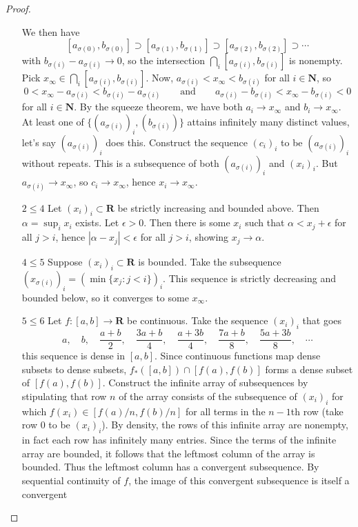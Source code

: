 \documentclass[oneside, 12pt]{memoir}
\theoremstyle{elegant}
\theoremstyle{elegant}
\def\RR{\mathbf R}
\def\NN{\mathbf N}
\begin{document}
\begin{proof}
\begin{itemize}
We then have
\[[a_{\sigma(0)}, b_{\sigma(0)}]\supset[a_{\sigma(1)}, b_{\sigma(1)}]\supset[a_{\sigma(2)}, b_{\sigma(2)}]
\supset\cdots
\]
with $b_{\sigma(i)} - a_{\sigma(i)}\to 0$, so the
intersection $\bigcap_i[a_{\sigma(i)}, b_{\sigma(i)}]$ is nonempty. Pick $x_\infty\in\bigcap_i[a_{\sigma(i)}, b_{\sigma(i)}]$. Now,
$a_{\sigma(i)} < x_\infty < b_{\sigma(i)}$ for all $i\in\NN$, so
\[0 < x_\infty - a_{\sigma(i)} < b_{\sigma(i)} - a_{\sigma(i)}\qquad\text{and}\qquad
a_{\sigma(i)} - b_{\sigma(i)} < x_\infty - b_{\sigma(i)} < 0\]
for all $i\in\NN$. By the squeeze theorem, we have both $a_i\to x_\infty$ and $b_i\to x_\infty$.
At least one of $\{(a_{\sigma(i)})_i, (b_{\sigma(i)})\}$ attains
infinitely many distinct values, let's say $(a_{\sigma(i)})_i$ does this.
Construct the sequence $(c_i)_i$ to be $(a_{\sigma(i)})_i$
without repeats. This is a subsequence of both $(a_{\sigma(i)})_i$
and $(x_i)_i$. But $a_{\sigma(i)}\to x_\infty$,
so $c_i\to x_\infty$, hence $x_i\to x_\infty$.
\item[$2\le 4$] Let $(x_i)_i\subset\RR$ be strictly increasing and bounded above.
Then $\alpha = \sup_ix_i$ exists. Let $\epsilon > 0$. Then there is some $x_i$
such that $\alpha < x_j + \epsilon$ for all $j > i$,
hence $|\alpha - x_j| < \epsilon$ for all $j > i$,
showing $x_j\to\alpha$.
\item[$4\le 5$] Suppose $(x_i)_i\subset\RR$ is bounded.
Take the subsequence $(x_{\sigma(i)})_i = (\min\{x_j : j < i\})_i$.
This sequence is strictly decreasing and bounded below, so it converges
to some $x_\infty$.
\item[$5\le 6$]
Let $f:[a, b]\to\RR$ be continuous.
Take the sequence $(x_i)_i$ that goes
\[a,\quad b,\quad\frac{a + b}{2},\quad\frac{3a + b}{4},\quad\frac{a + 3b}{4},\quad\frac{7a + b}{8},\quad\frac{5a + 3b}{8},\quad\cdots\]
this sequence is dense in $[a, b]$. Since continuous functions map dense subsets to dense subsets,
$f_*([a, b])\cap[f(a), f(b)]$ forms a dense subset of $[f(a), f(b)]$.
Construct the infinite array of subsequences by stipulating that row $n$ of the array consists of the
subsequence of $(x_i)_i$ for which $f(x_i)\in[f(a)/n, f(b)/n]$ for all terms in the $n-1$th row (take row $0$ to be $(x_i)_i$).
By density, the rows of this infinite array are nonempty, in fact each row has infinitely many entries.
Since the terms of the infinite array are bounded, it follows that the leftmost column of the array is bounded. Thus the
leftmost column has a convergent subsequence. By sequential continuity of $f$, the image of this convergent subsequence is itself a convergent

\end{itemize}
\end{proof}
\end{document}
